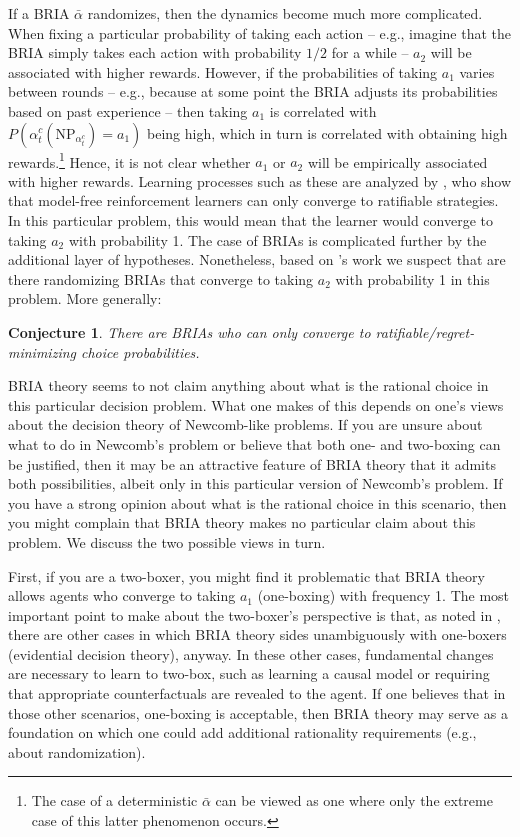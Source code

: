 \documentclass[submission,copyright,creativecommons]{eptcs}
\newtheorem{conjecture}{Conjecture}
\begin{document}
\begin{extendedonlyblock}
If a BRIA $\bar \alpha$ randomizes, then the dynamics become much more complicated. When fixing a particular probability of taking each action -- e.g., imagine that the BRIA simply takes each action with probability $1/2$ for a while -- $a_2$ will be associated with higher rewards. However, if the probabilities of taking $a_1$ varies between rounds -- e.g., because at some point the BRIA adjusts its probabilities based on past experience -- then taking $a_1$ is correlated with $P(\alpha^c_t(\mathrm{NP}_{\alpha_t^c}){=}a_1)$ being high, which in turn is correlated with obtaining high rewards.\footnote{The case of a deterministic $\bar \alpha$ can be viewed as one where only the extreme case of this latter phenomenon occurs.} Hence, it is not clear whether $a_1$ or $a_2$ will be empirically associated with higher rewards. Learning processes such as these are analyzed by \citet{GranCanaria}, who show that model-free reinforcement learners can only converge to ratifiable strategies. In this particular problem, this would mean that the learner would converge to taking $a_2$ with probability 1. The case of BRIAs is complicated further by the additional layer of hypotheses. Nonetheless, based on \citeauthor{GranCanaria}'s work we suspect that are there randomizing BRIAs that converge to taking $a_2$ with probability 1 in this problem. More generally:

\begin{conjecture}\label{conjecture:random-BRIA-ratifiable}
There are BRIAs who can only converge to ratifiable/regret-minimizing choice probabilities.
\end{conjecture}

BRIA theory seems to not claim anything about what is the rational choice in this particular decision problem. What one makes of this depends on one's views about the decision theory of Newcomb-like problems. If you are unsure about what to do in Newcomb's problem or believe that both one- and two-boxing can be justified, then it may be an attractive feature of BRIA theory that it admits both possibilities, albeit only in this particular version of Newcomb's problem. If you have a strong opinion about what is the rational choice in this scenario, then you might complain that BRIA theory makes no particular claim about this problem. We discuss the two possible views in turn.

First, if you are a two-boxer, you might find it problematic that BRIA theory allows agents who converge to taking $a_1$ (one-boxing) with frequency 1. The most important point to make about the two-boxer's perspective is that, as noted in , there are other cases in which BRIA theory sides unambiguously with one-boxers (evidential decision theory), anyway. In these other cases, fundamental changes are necessary to learn to two-box, such as learning a causal model or requiring that appropriate counterfactuals are revealed to the agent. If one believes that in those other scenarios, one-boxing is acceptable, then BRIA theory may serve as a foundation on which one could add additional rationality requirements (e.g., about randomization).


\end{extendedonlyblock}
\end{document}
